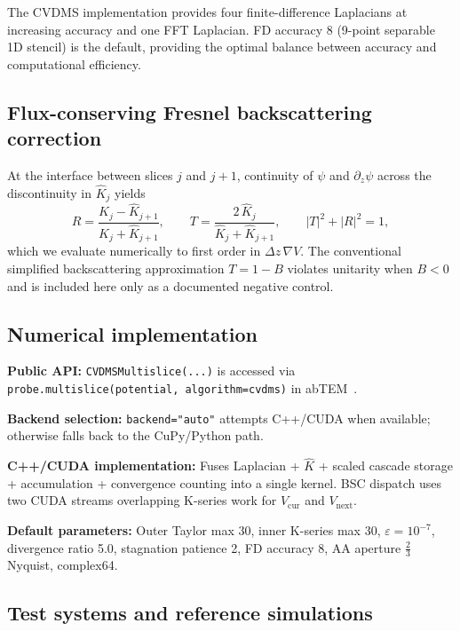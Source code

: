 \documentclass[twoside,11pt]{article}
\begin{document}
The CVDMS implementation provides four finite-difference Laplacians at increasing accuracy and one FFT Laplacian. FD accuracy 8 (9-point separable 1D stencil) is the default, providing the optimal balance between accuracy and computational efficiency.


\subsection{Flux-conserving Fresnel backscattering correction}\label{sec:bsc}

At the interface between slices $j$ and $j+1$, continuity of $\psi$ and $\partial_z\psi$ across the discontinuity in $\hat{K}_j$ yields
\begin{equation}\label{eq:fresnel-bsc}
R=\frac{\hat{K}_j-\hat{K}_{j+1}}{\hat{K}_j+\hat{K}_{j+1}},\qquad
T=\frac{2\,\hat{K}_j}{\hat{K}_j+\hat{K}_{j+1}},\qquad
|T|^2+|R|^2=1,
\end{equation}
which we evaluate numerically to first order in $\Delta z\,\nabla V$. The conventional simplified backscattering approximation $T=1-B$ violates unitarity when $B<0$ and is included here only as a documented negative control.

\subsection{Numerical implementation}

\textbf{Public API:} {\tt CVDMSMultislice(...)} is accessed via {\tt probe.multislice(potential, algorithm=cvdms)} in abTEM~\cite{MadsenSusi2021}.

\textbf{Backend selection:} {\tt backend="auto"} attempts C++/CUDA when available; otherwise falls back to the CuPy/Python path.

\textbf{C++/CUDA implementation:} Fuses Laplacian + $\hat{K}$ + scaled cascade storage + accumulation + convergence counting into a single kernel. BSC dispatch uses two CUDA streams overlapping K-series work for $V_\text{cur}$ and $V_\text{next}$.

\textbf{Default parameters:} Outer Taylor max 30, inner K-series max 30, $\varepsilon=10^{-7}$, divergence ratio 5.0, stagnation patience 2, FD accuracy 8, AA aperture $\tfrac23$ Nyquist, complex64.

\subsection{Test systems and reference simulations}\label{sec:test-systems}
\end{document}
